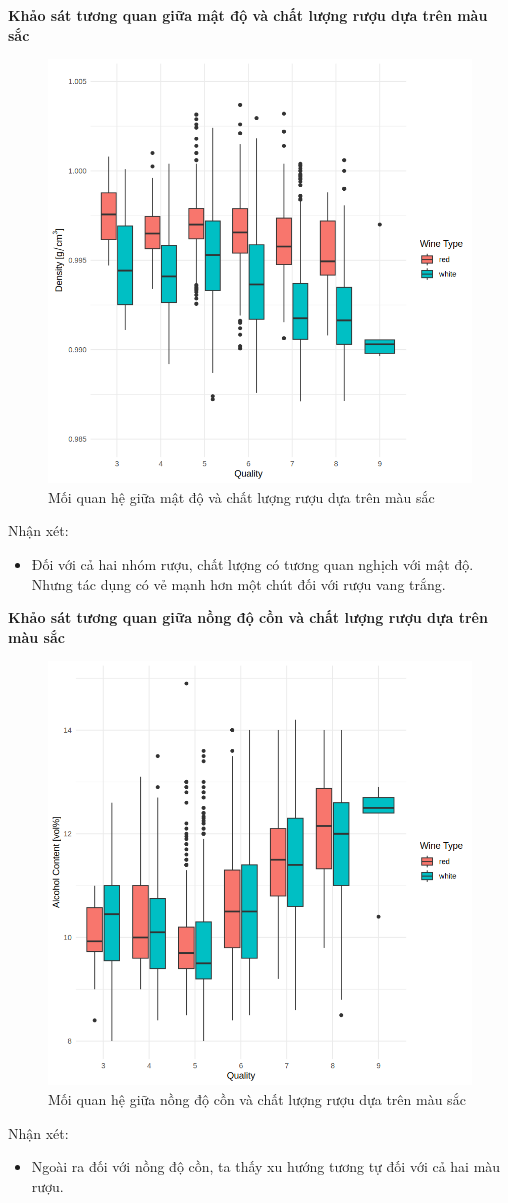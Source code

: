 \textbf{Khảo sát tương quan giữa mật độ và chất lượng rượu dựa trên màu sắc}
\begin{figure}[H]
    \centering
    \includegraphics[width=0.75\columnwidth]{wine_colors/wine_density_quality_color.png}
    \caption{Mối quan hệ giữa mật độ và chất lượng rượu dựa trên màu sắc}
    \label{fig:wine_density_quality_color}
\end{figure}
Nhận xét:
\begin{itemize}
    \item Đối với cả hai nhóm rượu, chất lượng có tương quan nghịch với mật độ. Nhưng tác dụng có vẻ mạnh hơn một chút đối với rượu vang trắng.
\end{itemize}

\textbf{Khảo sát tương quan giữa nồng độ cồn và chất lượng rượu dựa trên màu sắc}
\begin{figure}[H]
    \centering
    \includegraphics[width=0.75\columnwidth]{wine_colors/wine_alcohol_quality_color.png}
    \caption{Mối quan hệ giữa nồng độ cồn và chất lượng rượu dựa trên màu sắc}
    \label{fig:wine_alcohol_quality_color}
\end{figure}
Nhận xét:
\begin{itemize}
    \item Ngoài ra đối với nồng độ cồn, ta thấy xu hướng tương tự đối với cả hai màu rượu.
\end{itemize}

